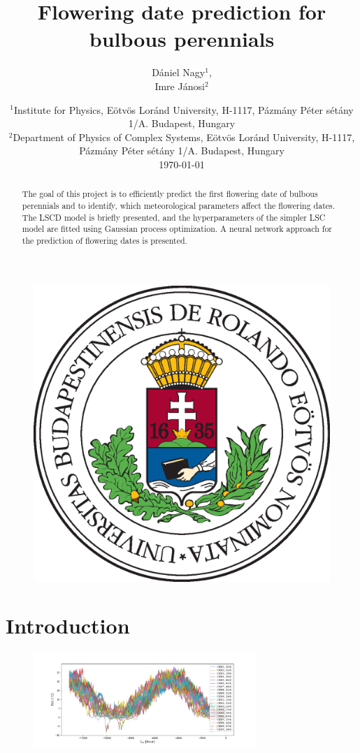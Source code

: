\documentclass[11pt, a4paper]{article}
\title{Flowering date prediction for bulbous perennials}
\author{Dániel Nagy$^1$,\\Imre Jánosi$^2$}
\date{%
    $^1$Institute for Physics, Eötvös Loránd University, H-1117, Pázmány Péter sétány 1/A. Budapest, Hungary\\%
    $^2$Department of Physics of Complex Systems, Eötvös Loránd University, H-1117, Pázmány Péter sétány 1/A. Budapest, Hungary\\[2ex]%
    \today
}
\begin{document}
\maketitle
\vspace{2.5cm}
\begin{figure}[H]
    \centering
    \includegraphics[scale=0.3]{images/elte.eps}
\end{figure}
\vspace{0.5cm}

\newpage
\begin{abstract}
    The goal of this project is to efficiently predict the first flowering date of bulbous perennials and to identify,
    which meteorological parameters affect the flowering dates. The LSCD model is briefly presented, and the hyperparameters
    of the simpler LSC model are fitted using Gaussian process optimization. A neural network approach for the
    prediction of flowering dates is presented.
\end{abstract}

\section*{Introduction}
\begin{figure}[H]
    \centering
    \includegraphics[width=0.75\textwidth]{images/temp_plot.png}
\end{figure}
\end{document}
